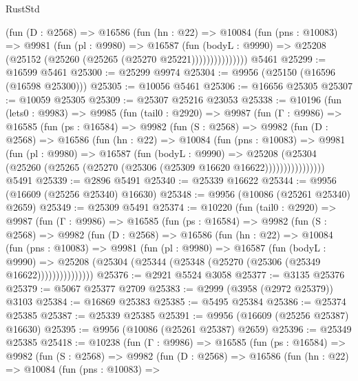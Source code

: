 \begin{lexlean}{RustStd}
\begin{coremodule}
                (fun (D : @2568) =>
                @16586
                  (fun (hn : @22) =>
                  @10084
                    (fun (pns : @10083) =>
                    @9981
                      (fun (pl : @9980) =>
                      @16587
                        (fun (bodyL : @9990) =>
                        @25208 (@25152 (@25260 (@25265 (@25270 @25221)))))))))))))))
    @5461
@25299 := @16599 @5461
@25300 := @25299 @9974
@25304 := @9956 (@25150 (@16596 (@16598 @25300)))
@25305 := @10056 @5461
@25306 := @16656 @25305
@25307 := @10059 @25305
@25309 := @25307 @25216 @23053
@25338 := @10196
    (fun (lets0 : @9983) =>
    @9985
      (fun (tail0 : @2920) =>
      @9987
        (fun (Γ : @9986) =>
        @16585
          (fun (ps : @16584) =>
          @9982
            (fun (S : @2568) =>
            @9982
              (fun (D : @2568) =>
              @16586
                (fun (hn : @22) =>
                @10084
                  (fun (pns : @10083) =>
                  @9981
                    (fun (pl : @9980) =>
                    @16587
                      (fun (bodyL : @9990) =>
                      @25208
                        (@25304
                          (@25260 (@25265 (@25270 (@25306 (@25309 @16620 @16622))))))))))))))))
    @5491
@25339 := @2896 @5491
@25340 := @25339 @16622
@25344 := @9956 (@16609 (@25256 @25340) @16630)
@25348 := @9956 (@10086 (@25261 @25340) @2659)
@25349 := @25309 @5491
@25374 := @10220
    (fun (tail0 : @2920) =>
    @9987
      (fun (Γ : @9986) =>
      @16585
        (fun (ps : @16584) =>
        @9982
          (fun (S : @2568) =>
          @9982
            (fun (D : @2568) =>
            @16586
              (fun (hn : @22) =>
              @10084
                (fun (pns : @10083) =>
                @9981
                  (fun (pl : @9980) =>
                  @16587
                    (fun (bodyL : @9990) =>
                    @25208 (@25304 (@25344 (@25348 (@25270 (@25306 (@25349 @16622)))))))))))))))
@25376 := @2921 @5524 @3058
@25377 := @3135 @25376
@25379 := @5067 @25377 @2709
@25383 := @2999 (@3958 (@2972 @25379)) @3103
@25384 := @16869 @25383
@25385 := @5495 @25384
@25386 := @25374 @25385
@25387 := @25339 @25385
@25391 := @9956 (@16609 (@25256 @25387) @16630)
@25395 := @9956 (@10086 (@25261 @25387) @2659)
@25396 := @25349 @25385
@25418 := @10238
    (fun (Γ : @9986) =>
    @16585
      (fun (ps : @16584) =>
      @9982
        (fun (S : @2568) =>
        @9982
          (fun (D : @2568) =>
          @16586
            (fun (hn : @22) =>
            @10084
              (fun (pns : @10083) =>

\end{coremodule}
\end{lexlean}
